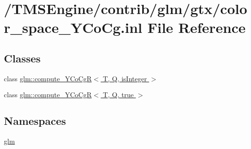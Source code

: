 \hypertarget{color__space___y_co_cg_8inl}{}\section{/\+T\+M\+S\+Engine/contrib/glm/gtx/color\+\_\+space\+\_\+\+Y\+Co\+Cg.inl File Reference}
\label{color__space___y_co_cg_8inl}
\subsection*{Classes}
\begin{DoxyCompactItemize}
\item 
class \hyperlink{classglm_1_1compute___y_co_cg_r}{glm\+::compute\+\_\+\+Y\+Co\+Cg\+R$<$ T, Q, is\+Integer $>$}
\item 
class \hyperlink{classglm_1_1compute___y_co_cg_r_3_01_t_00_01_q_00_01true_01_4}{glm\+::compute\+\_\+\+Y\+Co\+Cg\+R$<$ T, Q, true $>$}
\end{DoxyCompactItemize}
\subsection*{Namespaces}
\begin{DoxyCompactItemize}
\item 
 \hyperlink{namespaceglm}{glm}
\end{DoxyCompactItemize}
